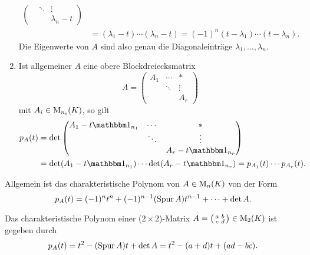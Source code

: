 \begin{example}
\begin{enumerate}
\begin{align*}
\begin{pmatrix}
                            & \ddots  & \vdots        \\
                            &         & \lambda_n - t
            \end{pmatrix}
        \\
        &=  (\lambda_1 - t) \dotsm (\lambda_n - t)
         =  (-1)^n (t - \lambda_1) \dotsm (t - \lambda_n).
      \end{align*}
      Die Eigenwerte von $A$ sind also genau die Diagonaleinträge $\lambda_1, \dotsc, \lambda_n$.
    \item
      Ist allgemeiner $A$ eine obere Blockdreiecksmatrix
      \[
          A
        = \begin{pmatrix}
            A_1 & \cdots  & *       \\
                & \ddots  & \vdots  \\
                &         & A_r
          \end{pmatrix}
      \]
      mit $A_i \in \operatorname{M}_{n_i}(K)$, so gilt
      \begin{align*}
            \charpol{A}(t)
        &=  \det
            \begin{pmatrix}
              A_1 - t \Id_{n_1} & \cdots  & *                 \\
                                & \ddots  & \vdots            \\
                                &         & A_r - t \Id_{n_r}
            \end{pmatrix}
        \\
        &=  \det (A_1 - t \Id_{n_1}) \dotsm \det(A_r - t \Id_{n_r})
         =  \charpol{A_1}(t) \dotsm \charpol{A_r}(t).
      \end{align*}
  \end{enumerate}
\end{example}

Allgemein ist das charakteristische Polynom von $A \in \operatorname{M}_{n}(K)$ von der Form
\[
    p_{A}(t)
  = (-1)^n t^n + (-1)^{n-1} (\operatorname{Spur} A) t^{n-1} + \dotsb + \det A.
\]
\begin{example}
  Das charakteristische Polynom einer ($2 \times 2$)-Matrix $A = \begin{psmallmatrix} a & b \\ c & d \end{psmallmatrix} \in \operatorname{M}_{2}(K)$ ist gegeben durch
  \[
      p_{A}(t)
    = t^2 - (\operatorname{Spur} A) t + \det A
    = t^2 - (a + d) t + (ad - bc).
  \]
\end{example}





